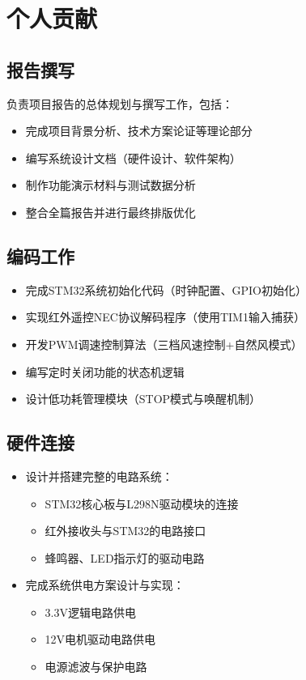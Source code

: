 
\section{个人贡献}

\subsection{报告撰写}
负责项目报告的总体规划与撰写工作，包括：
\begin{itemize}
    \item 完成项目背景分析、技术方案论证等理论部分
    \item 编写系统设计文档（硬件设计、软件架构）
    \item 制作功能演示材料与测试数据分析
    \item 整合全篇报告并进行最终排版优化
\end{itemize}

\subsection{编码工作}
\begin{itemize}
    \item 完成STM32系统初始化代码（时钟配置、GPIO初始化）
    \item 实现红外遥控NEC协议解码程序（使用TIM1输入捕获）
    \item 开发PWM调速控制算法（三档风速控制+自然风模式）
    \item 编写定时关闭功能的状态机逻辑
    \item 设计低功耗管理模块（STOP模式与唤醒机制）
\end{itemize}

\subsection{硬件连接}
\begin{itemize}
    \item 设计并搭建完整的电路系统：
    \begin{itemize}
        \item STM32核心板与L298N驱动模块的连接
        \item 红外接收头与STM32的电路接口
        \item 蜂鸣器、LED指示灯的驱动电路
    \end{itemize}
    \item 完成系统供电方案设计与实现：
    \begin{itemize}
        \item 3.3V逻辑电路供电
        \item 12V电机驱动电路供电
        \item 电源滤波与保护电路
    \end{itemize}
\end{itemize}


